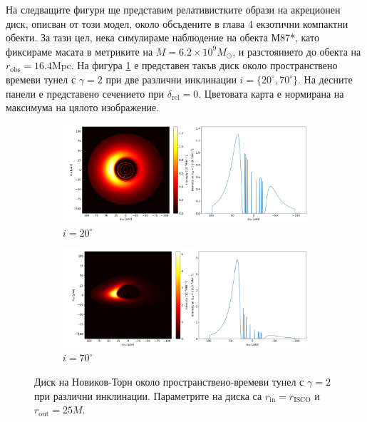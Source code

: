 На следващите фигури ще представим релативистките образи на акреционен диск, описван от този модел, около обсъдените в глава 4 екзотични компактни обекти. За тази цел, нека симулираме наблюдение на обекта М87*, като фиксираме масата в метриките на $M = 6.2\times10^9 M_\odot$, и разстоянието до обекта на $r_\text{obs} = 16.4 \text{Mpc}$. На фигура \ref{WH_NT} е представен такъв диск около пространствено времеви тунел с $\gamma = 2$ при две различни инклинации $i=\{20^\circ, 70^\circ\}$. На десните панели е представено сечението при $\delta_\text{rel} = 0$. Цветовата карта е нормирана на максимума на цялото изображение. \\

\begin{figure}[!htb]
	\centering
	\begin{subfigure}{12cm}
		\hspace{-0.6cm}
		\includegraphics[scale = 0.26]{WH_NT_Gamma2_20_deg.png}
		\caption{$i = 20^\circ$} 
	\end{subfigure}
	\begin{subfigure}{12cm}
		\hspace{-0.6cm}
		\includegraphics[scale = 0.26]{WH_NT_Gamma2_70_deg.png}
		\caption{$i = 70^\circ$} 
	\end{subfigure}
	\caption[Диск на Новиков-Торн около пространствено-времеви тунел при различни инклинации.]{\small Диск на Новиков-Торн около пространствено-времеви тунел с $\gamma = 2$ при различни инклинации. Параметрите на диска са $r_\text{in} = r_\text{ISCO}$ и $r_\text{out} = 25M$.} 
	\label{WH_NT}
\end{figure}

